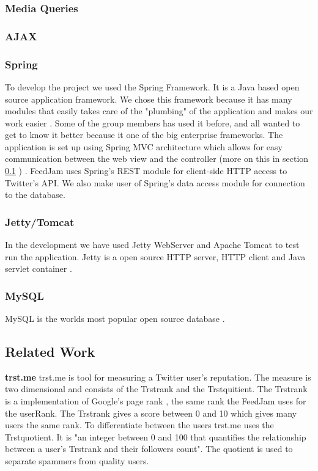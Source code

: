 \subsubsection{Media Queries} %
\subsubsection{AJAX}%
\subsubsection{Spring} %
To develop the project we used the Spring Framework. It is a Java based open source application framework. We chose this framework because it has many modules that easily takes care of the "plumbing" of the application and makes our work easier \citep{SpringSourcec}. Some of the group members has used it before, and all wanted to get to know it better because it one of the big enterprise frameworks. The application is set up using Spring MVC architecture which allows for easy communication between the web view and the controller (more on this in section \ref{} \nameref{}) \citep{SpringSourcee}. FeedJam uses Spring's REST module for client-side HTTP access to Twitter's API. We also make user of Spring's data access module for connection to the database.

\subsubsection{Jetty/Tomcat} %
In the development we have used Jetty WebServer and Apache Tomcat to test run the application. Jetty is a open source HTTP server, HTTP client and Java servlet container \citep{MortBayConsultinga}. 

\subsubsection{MySQL} %
MySQL is the worlds most popular open source database \citep{OracleCorporationand/oritsaffiliates}.

\subsection{Related Work}
{\bf trst.me} \newline
trst.me \citet{Infochimps2012b} is tool for measuring a Twitter user's reputation. The measure is two dimensional and consists of the Trstrank and the Trstquitient. The Trstrank is a implementation of Google's page rank \citep{Infochimps2012a}, the same rank the FeedJam uses for the userRank. The Trstrank gives a score between 0 and 10 which gives many users the same rank. To differentiate between the users trst.me uses the Trstquotient. It is "an integer between 0 and 100 that quantifies the relationship between a user's Trstrank and their followers count"\citep{Infochimps2012}. The quotient is used to separate spammers from quality users. 

